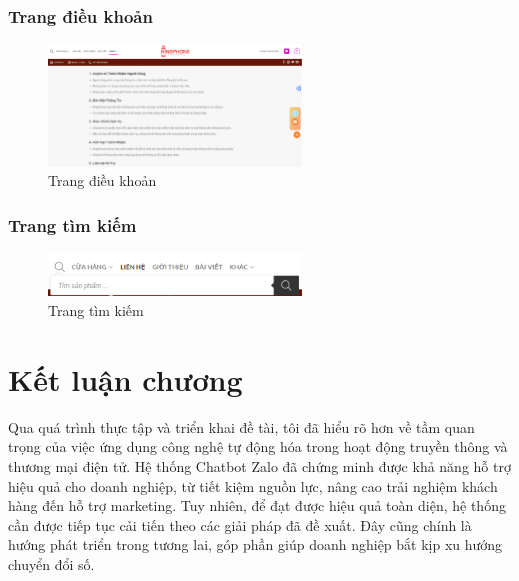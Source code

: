 \subsubsection{Trang điều khoản}
\begin{figure}[H]
    \centering
    \includegraphics[width=0.6\textwidth]{img/dieukhoan.png}
    \caption{Trang điều khoản}
    \label{fig:dkhoan}
\end{figure}

\subsubsection{Trang tìm kiếm}
\begin{figure}[H]
    \centering
    \includegraphics[width=0.6\textwidth]{img/timkiem.png}
    \caption{Trang tìm kiếm}
    \label{fig:tkiem}
\end{figure}

\section*{Kết luận chương}
Qua quá trình thực tập và triển khai đề tài, tôi đã hiểu rõ hơn về tầm quan trọng
của việc ứng dụng công nghệ tự động hóa trong hoạt động truyền thông và thương mại
điện tử. Hệ thống Chatbot Zalo đã chứng minh được khả năng hỗ trợ hiệu quả cho
doanh nghiệp, từ tiết kiệm nguồn lực, nâng cao trải nghiệm khách hàng đến hỗ trợ
marketing. Tuy nhiên, để đạt được hiệu quả toàn diện, hệ thống cần được tiếp tục cải
tiến theo các giải pháp đã đề xuất. Đây cũng chính là hướng phát triển trong tương lai,
góp phần giúp doanh nghiệp bắt kịp xu hướng chuyển đổi số.

